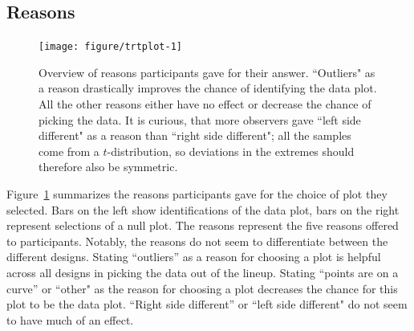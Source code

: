 \documentclass[12pt]{article}\usepackage[]{graphicx}\usepackage[]{color}
\newenvironment{knitrout}{}{} %
\begin{document}
\begin{appendix}
\section{Reasons}

\begin{figure}[hbt]
\centering
\begin{knitrout}
\color{fgcolor}
\texttt{[image: figure/trtplot-1]} 

\end{knitrout}
\caption{\label{fig:choices}Overview of reasons participants gave for  their answer. ``Outliers" as a reason drastically improves the chance of identifying the data plot. All the other reasons either have no effect or decrease the chance of picking the data. It is curious, that more observers gave ``left side different" as a reason than ``right side different";   all the samples  come from a  $t$-distribution, so deviations in the extremes should therefore also be symmetric.}
\end{figure}
\afterpage{\clearpage}

Figure~\ref{fig:choices} summarizes the reasons participants gave for the choice of plot they selected. Bars on the left show  identifications of the data plot, bars on the right represent selections of a null plot. The reasons represent the five reasons offered  to participants. Notably, the reasons do not seem to differentiate between the different designs. Stating ``outliers'' as a reason for choosing a plot is helpful across all designs in picking the data out of the lineup. Stating ``points are on a curve'' or ``other"  as the reason for choosing a plot decreases the chance for this plot to be the data plot. ``Right side different'' or ``left side different" do not seem to have much of an effect.


\end{appendix}
\end{document}
